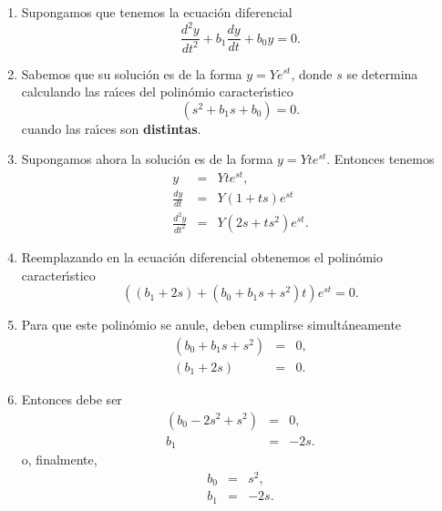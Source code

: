 \begin{enumerate}

\item Supongamos que tenemos la ecuaci\'{o}n diferencial
\begin{equation}
        \frac{d^{2}y}{dt^{2}} + b_{1} \frac{dy}{dt} + b_{0} y = 0. 
\end{equation}

\item Sabemos que su soluci\'{o}n es de la forma $y = Y e^{s t}$, donde $s$ se determina calculando las 
ra\'{\i}ces del polin\'{o}mio caracter\'{\i}stico
\begin{equation}
        (s^{2} + b_{1} s + b_{0}) = 0.
\end{equation}
cuando las ra\'{\i}ces son \textbf{distintas}. 

\item Supongamos ahora la soluci\'{o}n es de la forma $y = Y t e^{s t}$. Entonces tenemos
\begin{eqnarray}
        y &=& Y t e^{s t},                                      \\
        \frac{dy}{dt} &=& Y (1 + t s) e^{s t}                   \\  
        \frac{d^{2}y}{dt^{2}} &=& Y (2 s + t s^{2}) e^{s t}.
\end{eqnarray}

\item Reemplazando en la ecuaci\'{o}n diferencial obtenemos el polin\'{o}mio caracter\'{\i}stico
\begin{equation}
        ((b_{1} + 2 s) + (b_{0} + b_{1} s + s^{2}) t) e^{s t} = 0.
\end{equation}

\item Para que este polin\'{o}mio se anule, deben cumplirse simult\'{a}neamente
\begin{eqnarray}
        (b_{0} + b_{1} s + s^{2})       &=&     0,      \\
        (b_{1} + 2 s)                   &=&     0.
\end{eqnarray}

\item Entonces debe ser
\begin{eqnarray}
        (b_{0} - 2 s^{2} + s^{2})       &=&     0,      \\
        b_{1}                           &=&     -2 s.
\end{eqnarray}
o, finalmente,
\begin{eqnarray}
        b_{0}   &=&     s^{2},                          \\
        b_{1}   &=&     -2 s.
\end{eqnarray}


\end{enumerate}
